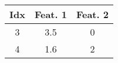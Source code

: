\documentclass{standalone}
\begin{document}
	\begin{tabular}{ccc}
		\toprule
		Idx & Feat. 1 & Feat. 2 \\
		\midrule
		\rowcolor{CBThree}
		3 & 3.5 & 0 \\
		\rowcolor{CBFour}
		4 & 1.6 & 2 \\
		\bottomrule
	\end{tabular}
\end{document}
